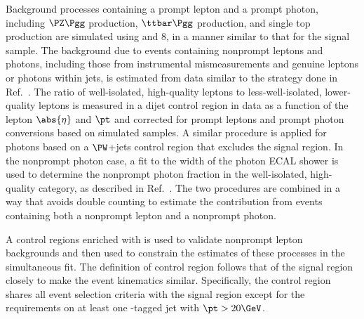 Background processes containing a prompt lepton and a prompt photon, including $\PZ\Pgg$ production, $\ttbar\Pgg$ production, and single top production are simulated using \MGvATNLO and {\PYTHIA}8, in a manner similar to that for the signal sample. The background due to events containing nonprompt leptons and photons, including those from instrumental mismeasurements and genuine leptons or photons within jets, is estimated from data similar to the strategy done in Ref.~\cite{CMS:2021foa}. The ratio of well-isolated, high-quality leptons to less-well-isolated, lower-quality leptons is measured in a dijet control region in data as a function of the lepton $\abs{\eta}$ and $\pt$ and corrected for prompt leptons and prompt photon conversions based on simulated samples. A similar procedure is applied for photons based on a $\PW$+jets control region that excludes the signal region. In the nonprompt photon case, a fit to the width of the photon ECAL shower is used to determine the nonprompt photon fraction in the well-isolated, high-quality category, as described in Ref.~\cite{Sirunyan_2020}. The two procedures are combined in a way that avoids double counting to estimate the contribution from events containing both a nonprompt lepton and a nonprompt photon. 

A control regions enriched with {\ttst} is used to validate nonprompt lepton backgrounds and then used to constrain the estimates of these processes in the simultaneous fit. The definition of {\ttst} control region follows that of the signal region closely to make the event kinematics similar. Specifically, the control region shares all event selection criteria with the signal region except for the requirements on at least one {\cPqb}-tagged jet with $\pt > 20\GeV$. 

